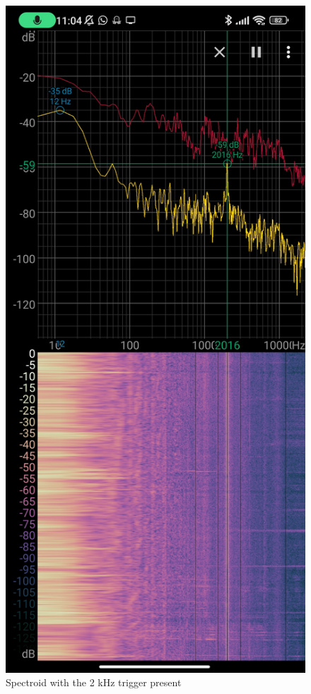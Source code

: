 \documentclass{report}
\theoremstyle{definition}
\theoremstyle{remark}
\begin{document}
\begin{figure}[!hbt]
    \centering
    \includegraphics[scale=0.1]{img/spectroid.jpg}
    \caption{Spectroid with the 2 kHz trigger present}
    \label{fig:spectroid}
\end{figure}
\end{document}

